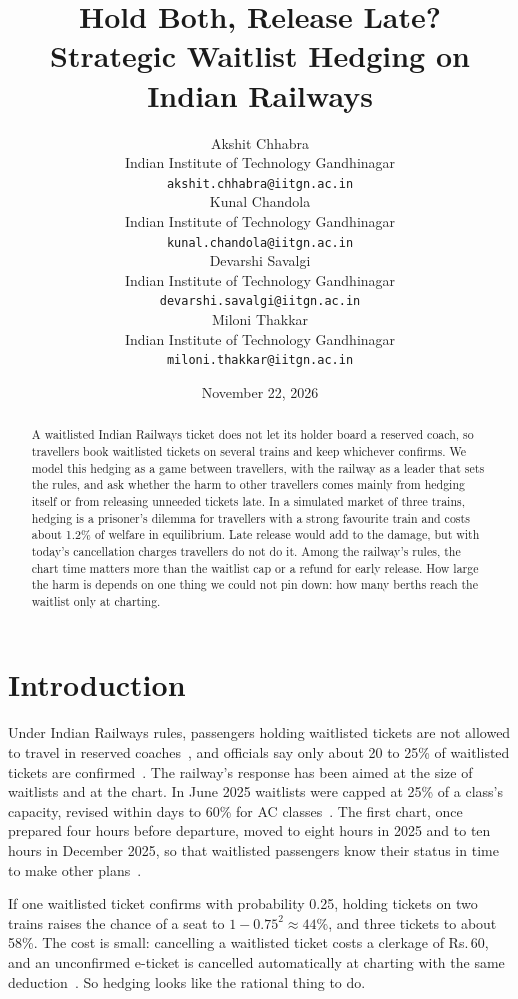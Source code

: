 \documentclass{article}
\title{Hold Both, Release Late?\\Strategic Waitlist Hedging on Indian Railways}
\author{
  Akshit Chhabra \\
  Indian Institute of Technology Gandhinagar \\
  \texttt{akshit.chhabra@iitgn.ac.in} \\
  \And
  Kunal Chandola \\
  Indian Institute of Technology Gandhinagar \\
  \texttt{kunal.chandola@iitgn.ac.in} \\
  \AND
  Devarshi Savalgi \\
  Indian Institute of Technology Gandhinagar \\
  \texttt{devarshi.savalgi@iitgn.ac.in} \\
  \And
  Miloni Thakkar \\
  Indian Institute of Technology Gandhinagar \\
  \texttt{miloni.thakkar@iitgn.ac.in} \\
}
\date{November 22, 2026}
\newcommand{\rs}{Rs.\,}
\theoremstyle{definition}
\begin{document}
\maketitle

\begin{abstract}
A waitlisted Indian Railways ticket does not let its holder board a reserved coach, so
travellers book waitlisted tickets on several trains and keep whichever confirms. We model
this hedging as a game between travellers, with the railway as a leader that sets the
rules, and ask whether the harm to other travellers comes mainly from hedging itself or
from releasing unneeded tickets late. In a simulated market of three trains, hedging is a
prisoner's dilemma for travellers with a strong favourite train and costs about 1.2\% of
welfare in equilibrium. Late release would add to the damage, but with today's
cancellation charges travellers do not do it. Among the railway's rules, the chart time
matters more than the waitlist cap or a refund for early release. How large the harm is
depends on one thing we could not pin down: how many berths reach the waitlist only at
charting.
\end{abstract}


\section{Introduction}

Under Indian Railways rules, passengers holding waitlisted tickets are not allowed to
travel in reserved coaches~\cite{rs}, and officials say only about 20 to 25\% of waitlisted
tickets are confirmed~\cite{quarter}. The railway's response has been aimed at the size of
waitlists and at the chart. In June 2025 waitlists were capped at 25\% of a class's
capacity, revised within days to 60\% for AC classes~\cite{cap}. The first chart, once
prepared four hours before departure, moved to eight hours in 2025 and to ten hours in
December 2025, so that waitlisted passengers know their status in time to make other
plans~\cite{chart10}.

If one waitlisted ticket confirms with probability 0.25, holding tickets on two trains
raises the chance of a seat to $1-0.75^2 \approx 44\%$, and three tickets to about 58\%.
The cost is small: cancelling a waitlisted ticket costs a clerkage of \rs60, and an
unconfirmed e-ticket is cancelled automatically at charting with the same
deduction~\cite{clerkage}. So hedging looks like the rational thing to do.
\end{document}
